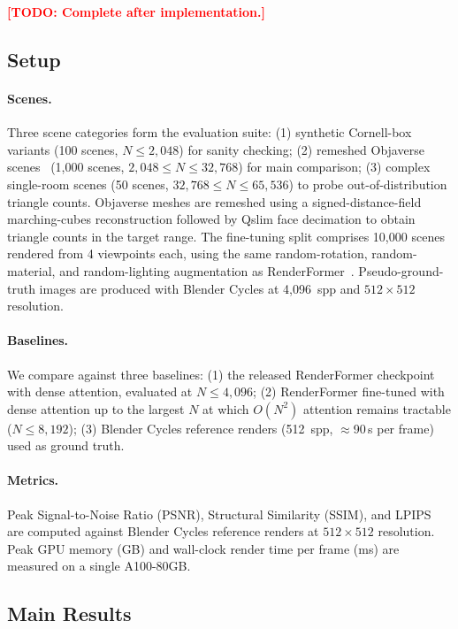 \documentclass{egpubl}
\newcommand{\RF}{RenderFormer\xspace}
\newcommand{\todo}[1]{\textcolor{red}{\textbf{[TODO: #1]}}}
\begin{document}
\todo{Complete after implementation.}

\subsection{Setup}

\paragraph{Scenes.}
Three scene categories form the evaluation suite:
(1) synthetic Cornell-box variants (100 scenes, $N \leq 2{,}048$)
for sanity checking;
(2) remeshed Objaverse scenes~\cite{deitke2022objaverse}
(1{,}000 scenes, $2{,}048 \leq N \leq 32{,}768$) for main comparison;
(3) complex single-room scenes (50 scenes,
$32{,}768 \leq N \leq 65{,}536$) to probe out-of-distribution triangle counts.
Objaverse meshes are remeshed using a signed-distance-field
marching-cubes reconstruction followed by Qslim face decimation
to obtain triangle counts in the target range.
The fine-tuning split comprises 10{,}000 scenes rendered from 4
viewpoints each, using the same random-rotation, random-material, and
random-lighting augmentation as \RF~\cite{zeng2025renderformer}.
Pseudo-ground-truth images are produced with Blender Cycles at 4{,}096~spp
and $512 \times 512$ resolution.

\paragraph{Baselines.}
We compare against three baselines:
(1) the released \RF checkpoint with dense attention, evaluated at
$N \leq 4{,}096$;
(2) \RF fine-tuned with dense attention up to the largest $N$ at which
$O(N^2)$ attention remains tractable ($N \leq 8{,}192$);
(3) Blender Cycles reference renders (512~spp, $\approx$90\,s per frame)
used as ground truth.

\paragraph{Metrics.}
Peak Signal-to-Noise Ratio (PSNR), Structural Similarity (SSIM), and
LPIPS~\cite{zhang2018lpips} are computed against Blender Cycles reference
renders at $512 \times 512$ resolution.
Peak GPU memory (GB) and wall-clock render time per frame (ms) are
measured on a single A100-80GB.

\subsection{Main Results}
\label{sec:results}
\end{document}
